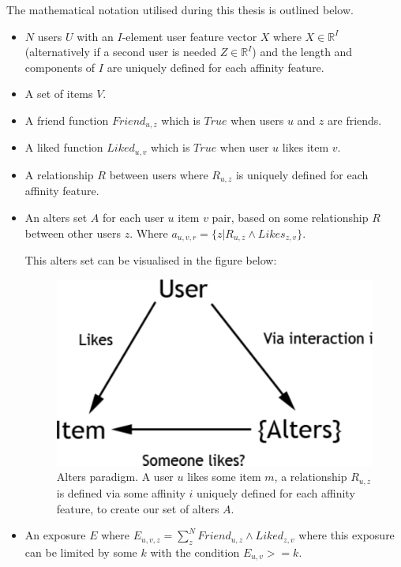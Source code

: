 The mathematical notation utilised during this thesis is outlined below.

\begin{itemize}
\item $N$ users $U$ with an $I$-element user feature vector $X$ where $X \in \mathbb{R}^I$ (alternatively if a second user is needed $Z \in \mathbb{R}^I$) 
and the length and components of $I$ are uniquely defined for each affinity feature.
\item A set of items $V$.
\item A friend function $Friend_{u,z}$ which is $True$ when users $u$ and $z$ are friends.
\item A liked function $Liked_{u,v}$ which is $True$ when user $u$ likes item $v$.
\item A relationship $R$ between users where $R_{u,z}$ is uniquely defined for each affinity feature.
\item An alters set $A$ for each user $u$ item $v$ pair, based on some relationship $R$ between other users $z$. 
Where $a_{u,v,r} = \{z | R_{u,z} \wedge Likes_{z,v}\}$.

This alters set can be visualised in the figure below:

\begin{figure}[tbh!]
	\begin{center}
		\includegraphics[scale=0.60]{imgs/alters.pdf}
		\caption{Alters paradigm. A user $u$ likes some item $m$, a relationship $R_{u,z}$ is defined via some affinity $i$ uniquely defined
		for each affinity feature, to create our set of alters $A$.}
	\end{center}
\end{figure}

\item An exposure $E$ where $E_{u,v,z} = \displaystyle\sum_{z}^{N} Friend_{u,z} \wedge Liked_{z,v}$ where this exposure can be 
limited by some $k$ with the condition $E_{u,v} >= k$.


\end{itemize}
